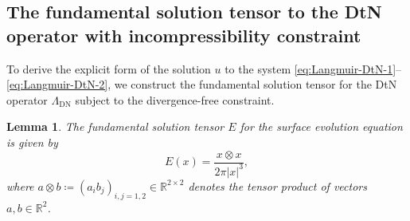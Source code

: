 \documentclass{article}
\newtheorem{lemma}[theorem]{Lemma}
\theoremstyle{remark}
\theoremstyle{definition}
\numberwithin{equation}{section}
\begin{document}
\subsection{The fundamental solution tensor to the DtN operator with incompressibility constraint}

To derive the explicit form of the solution $u$ to the system \eqref{eq:Langmuir-DtN-1}--\eqref{eq:Langmuir-DtN-2}, we construct the fundamental solution tensor for the DtN operator $\Lambda_{\mathrm{DN}}$ subject to the divergence-free constraint.

\begin{lemma}
    \label{lem:fund_sol}
    The fundamental solution tensor $E$ for the surface evolution equation is given by
    \begin{equation}
        E(x)=\frac{x\otimes x}{2\pi|x|^3},
        \label{eq:fundamental_explicit}
    \end{equation}
    where $a\otimes b\coloneqq(a_ib_j)_{i,j=1,2}\in\mathbb{R}^{2\times2}$ denotes the tensor product of vectors $a, b \in \mathbb{R}^2$.
\end{lemma}
\end{document}
